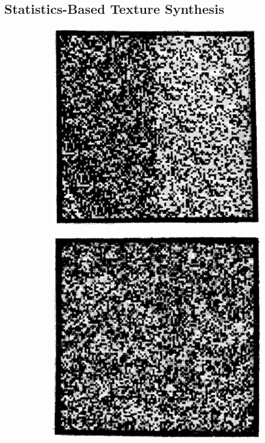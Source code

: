 \subsection{Statistics-Based Texture Synthesis}
\label{section:background-texture_synthesis-statistics_based}

\begin{figure}[ht]
    \centering
    \begin{subfigure}[b]{0.3\textwidth}
        \centering
        \includegraphics[width=\textwidth]{images/02-julesz-1st_order.jpg}
        \caption{}
    \end{subfigure}
    \hfill
    \begin{subfigure}[b]{0.29\textwidth}
        \centering
        \includegraphics[width=\textwidth]{images/02-julesz-2nd_order.jpg}

\end{subfigure}
\end{figure}
